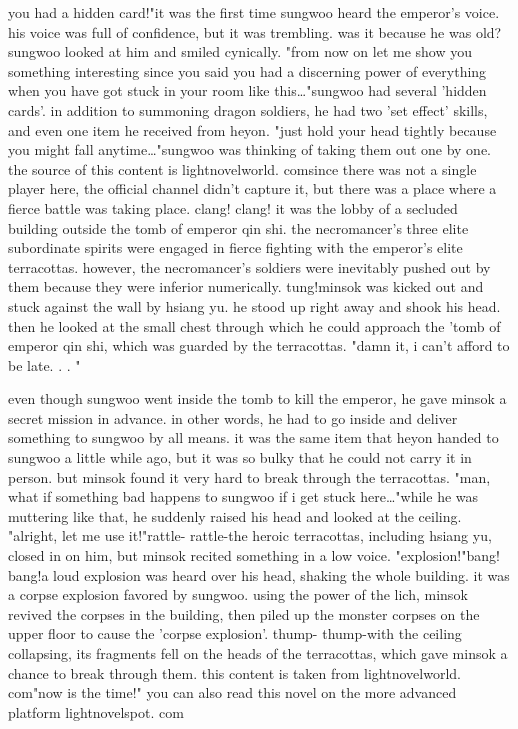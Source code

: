 you had a hidden card!"it was the first time sungwoo heard the emperor's voice.
 his voice was full of confidence, but it was trembling.
 was it because he was old?sungwoo looked at him and smiled cynically.
"from now on let me show you something interesting since you said you had a discerning power of everything when you have got stuck in your room like this…"sungwoo had several 'hidden cards'.
 in addition to summoning dragon soldiers, he had two 'set effect' skills, and even one item he received from heyon.
"just hold your head tightly because you might fall anytime…"sungwoo was thinking of taking them out one by one.
the source of this content is lightnovelworld.
c‌omsince there was not a single player here, the official channel didn't capture it, but there was a place where a fierce battle was taking place.
clang! clang! it was the lobby of a secluded building outside the tomb of emperor qin shi.
the necromancer's three elite subordinate spirits were engaged in fierce fighting with the emperor's elite terracottas.
however, the necromancer's soldiers were inevitably pushed out by them because they were inferior numerically.
tung!minsok was kicked out and stuck against the wall by hsiang yu.
 he stood up right away and shook his head.
 then he looked at the small chest through which he could approach the 'tomb of emperor qin shi, which was guarded by the terracottas.
 "damn it, i can't afford to be late.
.
.
"

even though sungwoo went inside the tomb to kill the emperor, he gave minsok a secret mission in advance.
 in other words, he had to go inside and deliver something to sungwoo by all means.
 it was the same item that heyon handed to sungwoo a little while ago, but it was so bulky that he could not carry it in person.
 but minsok found it very hard to break through the terracottas.
 "man, what if something bad happens to sungwoo if i get stuck here…"while he was muttering like that, he suddenly raised his head and looked at the ceiling.
"alright, let me use it!"rattle- rattle-the heroic terracottas, including hsiang yu, closed in on him, but minsok recited something in a low voice.
 "explosion!"bang! bang!a loud explosion was heard over his head, shaking the whole building.
it was a corpse explosion favored by sungwoo.
 using the power of the lich, minsok revived the corpses in the building, then piled up the monster corpses on the upper floor to cause the 'corpse explosion'.
thump- thump-with the ceiling collapsing, its fragments fell on the heads of the terracottas, which gave minsok a chance to break through them.
this content is taken from lightnovelworld.
com"now is the time!" you can also read this novel on the more advanced platform lightnovelspot.
com

 